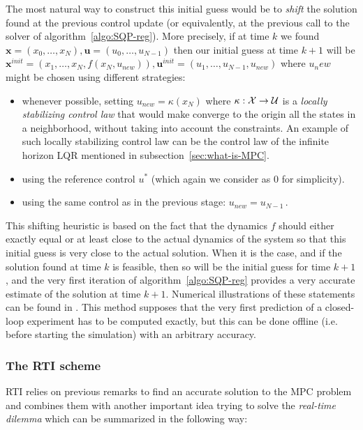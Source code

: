 \documentclass[12pt]{article}
\begin{document}
The most natural way to construct this initial guess would be to \textit{shift} the solution found at the previous control update (or equivalently, at the previous call to the solver of algorithm~\ref{algo:SQP-reg}).
More precisely, if at time $k$ we found $\mathbf{x}=(x_0,\ldots,x_N),\mathbf{u}=(u_0,\ldots,u_{N-1})$ then our initial guess at time $k+1$ will be $\mathbf{x}^{init}=(x_1,\ldots,x_N,f(x_N,u_{new})),\mathbf{u}^{init}=(u_1,\ldots,u_{N-1},u_{new})$ where $u_new$ might be chosen using different strategies:
\begin{itemize}[label=\textbullet]
	\item whenever possible, setting $u_{new}=\kappa(x_N)$ where $\kappa:\cal{X}\to\cal{U}$ is a \textit{locally stabilizing control law} that would make converge to the origin all the states in a neighborhood, without taking into account the constraints.
	An example of such locally stabilizing control law can be the control law of the infinite horizon LQR mentioned in subsection~\ref{sec:what-is-MPC}.

	\item using the reference control $u^*$ (which again we consider as $0$ for simplicity).

 	\item using the same control as in the previous stage: $u_{new}=u_{N-1}$\,.
\end{itemize}

This shifting heuristic is based on the fact that the dynamics $f$ should either exactly equal or at least close to the actual dynamics of the system so that this initial guess is very close to the actual solution.
When it is the case, and if the solution found at time $k$ is feasible, then so will be the initial guess for time $k+1$, and the very first iteration of algorithm~\ref{algo:SQP-reg} provides a very accurate estimate of the solution at time $k+1$.
Numerical illustrations of these statements can be found in \cite{mpc-rti}.
This method supposes that the very first prediction of a closed-loop experiment has to be computed exactly, but this can be done offline (i.e. before starting the simulation) with an arbitrary accuracy.

\subsubsection{The RTI scheme}

RTI relies on previous remarks to find an accurate solution to the MPC problem and combines them with another important idea trying to solve the \textit{real-time dilemma} which can be summarized in the following way:
\end{document}
